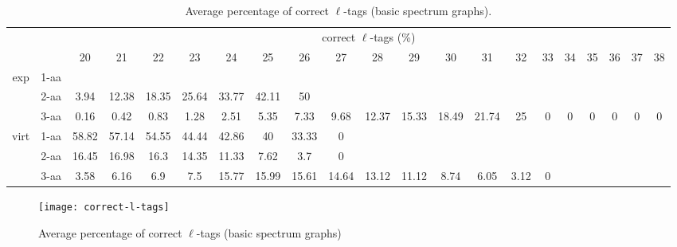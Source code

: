 \documentclass{article}[12pt]
\begin{document}
\begin{landscape}
\begin{table}[h]\tiny
\vspace{3mm}
{\centering
\begin{center}
\begin{tabular}{|c|l|c|c|c|c|c|c|c|c|c|c|c|c|c|c|c|c|c|c|c|}
  \hline
  \multicolumn{2}{|c|}{ } & \multicolumn{ 19 }{|c|}{ correct $\ell$-tags (\%)} \\
  \cline{3- 21}
  \multicolumn{2}{|c|}{ }  & 20 & 21 & 22 & 23 & 24 & 25 & 26 & 27 & 28 & 29 & 30 & 31 & 32 & 33 & 34 & 35 & 36 & 37 & 38\\
  \hline
  \multirow{3}{*}{exp}
&  1-aa  &  &  &  &  &  &  &  &  &  &  &  &  &  &  &  &  &  &  & \\
&  2-aa  & 3.94 & 12.38 & 18.35 & 25.64 & 33.77 & 42.11 & 50 &  &  &  &  &  &  &  &  &  &  &  & \\
&  3-aa  & 0.16 & 0.42 & 0.83 & 1.28 & 2.51 & 5.35 & 7.33 & 9.68 & 12.37 & 15.33 & 18.49 & 21.74 & 25 & 0 & 0 & 0 & 0 & 0 & 0\\
 \hline
  \multirow{3}{*}{virt} 
&  1-aa  & 58.82 & 57.14 & 54.55 & 44.44 & 42.86 & 40 & 33.33 & 0 &  &  &  &  &  &  &  &  &  &  & \\
&  2-aa  & 16.45 & 16.98 & 16.3 & 14.35 & 11.33 & 7.62 & 3.7 & 0 &  &  &  &  &  &  &  &  &  &  & \\
&  3-aa  & 3.58 & 6.16 & 6.9 & 7.5 & 15.77 & 15.99 & 15.61 & 14.64 & 13.12 & 11.12 & 8.74 & 6.05 & 3.12 & 0 &  &  &  &  & \\
 \hline
\end{tabular}
\end{center}
\par}
\centering
\caption{ Average percentage of correct $\ell$-tags (basic spectrum graphs).}
\label{table:correct-l-tags}
\vspace{3mm}
\end{table}

\end{landscape}

\begin{figure}
  \begin{center}
\texttt{[image: correct-l-tags]}
\end{center}
\caption{Average percentage of correct $\ell$-tags (basic spectrum graphs)}
  \label{fig:correct-l-tags}
\end{figure}
\end{document}
